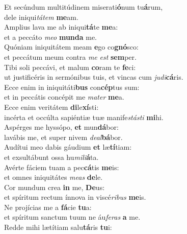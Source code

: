 \evenverse Et secúndum multitúdinem miserati\textbf{ó}num tu\textbf{á}rum,~\*\\
\evenverse dele iniqui\textit{tá}\textit{tem} \textbf{me}am.\\
\oddverse Amplius lava me ab iniqui\textbf{tá}te \textbf{me}a:~\*\\
\oddverse et a peccáto \textit{me}\textit{o} \textbf{mun}\textbf{da} me.\\
\evenverse Quóniam iniquitátem meam \textbf{e}go co\textbf{gnó}sco:~\*\\
\evenverse et peccátum meum contra \textit{me} \textit{est} \textbf{sem}per.\\
\oddverse Tibi soli peccávi, et malum \textbf{co}ram te \textbf{fe}ci:~\*\\
\oddverse ut justificéris in sermónibus tuis, et vincas cum \textit{ju}\textit{di}\textbf{cá}ris.\\
\evenverse Ecce enim in iniquitáti\textbf{bus} con\textbf{cép}tus sum:~\*\\
\evenverse et in peccátis concépit me \textit{ma}\textit{ter} \textbf{me}a.\\
\oddverse Ecce enim veritátem \textbf{di}le\textbf{xí}sti:~\*\\
\oddverse incérta et occúlta sapiéntiæ tuæ manife\textit{stá}\textit{sti} \textbf{mi}hi.\\
\evenverse Aspérges me hyssópo, \textbf{et} mun\textbf{dá}bor:~\*\\
\evenverse lavábis me, et super nivem \textit{de}\textit{al}\textbf{bá}bor.\\
\oddverse Audítui meo dabis gáudium \textbf{et} læ\textbf{tí}tiam:~\*\\
\oddverse et exsultábunt ossa hu\textit{mi}\textit{li}\textbf{á}ta.\\
\evenverse Avérte fáciem tuam a pec\textbf{cá}tis \textbf{me}is:~\*\\
\evenverse et omnes iniquitátes \textit{me}\textit{as} \textbf{de}le.\\
\oddverse Cor mundum crea \textbf{in} me, \textbf{De}us:~\*\\
\oddverse et spíritum rectum ínnova in viscé\textit{ri}\textit{bus} \textbf{me}is.\\
\evenverse Ne projícias me a \textbf{fá}cie \textbf{tu}a:~\*\\
\evenverse et spíritum sanctum tuum ne áu\textit{fe}\textit{ras} \textbf{a} me.\\
\oddverse Redde mihi lætítiam salu\textbf{tá}ris \textbf{tu}i:~\*\\
